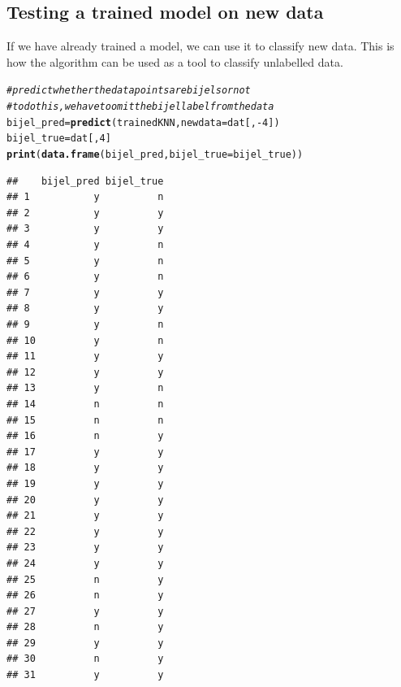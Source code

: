 \documentclass{article}\usepackage[]{graphicx}\usepackage[]{color}
\makeatletter
\newcommand{\hlnum}[1]{\textcolor[rgb]{0.686,0.059,0.569}{#1}}%
\newcommand{\hlcom}[1]{\textcolor[rgb]{0.678,0.584,0.686}{\textit{#1}}}%
\newcommand{\hlopt}[1]{\textcolor[rgb]{0,0,0}{#1}}%
\newcommand{\hlstd}[1]{\textcolor[rgb]{0.345,0.345,0.345}{#1}}%
\newcommand{\hlkwb}[1]{\textcolor[rgb]{0.69,0.353,0.396}{#1}}%
\newcommand{\hlkwc}[1]{\textcolor[rgb]{0.333,0.667,0.333}{#1}}%
\newcommand{\hlkwd}[1]{\textcolor[rgb]{0.737,0.353,0.396}{\textbf{#1}}}%
\newenvironment{kframe}{%
 \def\at@end@of@kframe{}%
 \ifinner\ifhmode%
  \def\at@end@of@kframe{\end{minipage}}%
  \begin{minipage}{\columnwidth}%
 \fi\fi%
 \def\FrameCommand##1{\hskip\@totalleftmargin \hskip-\fboxsep
 \colorbox{shadecolor}{##1}\hskip-\fboxsep
     \hskip-\linewidth \hskip-\@totalleftmargin \hskip\columnwidth}%
 \MakeFramed {\advance\hsize-\width
   \@totalleftmargin\z@ \linewidth\hsize
   \@setminipage}}%
 {\par\unskip\endMakeFramed%
 \at@end@of@kframe}
\newenvironment{knitrout}{}{} %
\makeatother
\begin{document}


\subsection{Testing a trained model on new data}
If we have already trained a model, we can use it to classify new data. This is how the algorithm can be used as a tool to classify unlabelled data.



\begin{knitrout}
\color{fgcolor}\begin{kframe}
\begin{alltt}
\hlcom{# predict whether the data points are bijels or not}
\hlcom{# to do this, we have to omit the bijel label from the data}
\hlstd{bijel_pred} \hlkwb{=} \hlkwd{predict}\hlstd{(trainedKNN,} \hlkwc{newdata} \hlstd{= dat[,}\hlopt{-}\hlnum{4}\hlstd{])}
\hlstd{bijel_true} \hlkwb{=} \hlstd{dat[,}\hlnum{4}\hlstd{]}
\hlkwd{print}\hlstd{(}\hlkwd{data.frame}\hlstd{(bijel_pred,} \hlkwc{bijel_true}\hlstd{=bijel_true))}
\end{alltt}
\begin{verbatim}
##    bijel_pred bijel_true
## 1           y          n
## 2           y          y
## 3           y          y
## 4           y          n
## 5           y          n
## 6           y          n
## 7           y          y
## 8           y          y
## 9           y          n
## 10          y          n
## 11          y          y
## 12          y          y
## 13          y          n
## 14          n          n
## 15          n          n
## 16          n          y
## 17          y          y
## 18          y          y
## 19          y          y
## 20          y          y
## 21          y          y
## 22          y          y
## 23          y          y
## 24          y          y
## 25          n          y
## 26          n          y
## 27          y          y
## 28          n          y
## 29          y          y
## 30          n          y
## 31          y          y
\end{verbatim}
\end{kframe}
\end{knitrout}
\end{document}
